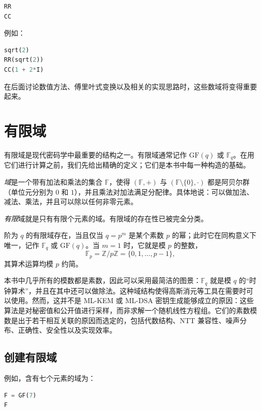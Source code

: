 \begin{lstlisting}[language=Python]
RR
CC
\end{lstlisting}

例如：

\begin{lstlisting}[language=Python]
sqrt(2)
RR(sqrt(2))
CC(1 + 2*I)
\end{lstlisting}

在后面讨论数值方法、傅里叶式变换以及相关的实现思路时，这些数域将变得重要起来。

\section{有限域}
有限域是现代密码学中最重要的结构之一。有限域通常记作 $\mathrm{GF}(q)$ 或 $\mathbb{F}_q$。在用它们进行计算之前，我们先给出精确的定义；它们是本书中每一种构造的基础。

\begin{definition}[域]
\emph{域}是一个带有加法和乘法的集合 $\mathbb{F}$，使得 $(\mathbb{F},+)$ 与 $(\mathbb{F}\setminus\{0\},\cdot)$ 都是阿贝尔群（单位元分别为 $0$ 和 $1$），并且乘法对加法满足分配律。具体地说：可以做加法、减法、乘法，并且可以除以任何非零元素。
\end{definition}

\emph{有限}域就是只有有限个元素的域。有限域的存在性已被完全分类。

\begin{theorem}[有限域的分类]
阶为 $q$ 的有限域存在，当且仅当 $q=p^m$ 是某个素数 $p$ 的幂；此时它在同构意义下唯一，记作 $\mathbb{F}_q$ 或 $\mathrm{GF}(q)$。当 $m=1$ 时，它就是模 $p$ 的整数，
\[
\mathbb{F}_p = \mathbb{Z}/p\mathbb{Z} = \{0,1,\dots,p-1\},
\]
其算术运算均模 $p$ 约简。
\end{theorem}

本书中几乎所有的模数都是素数，因此可以采用最简洁的图景：$\mathbb{F}_q$ 就是模 $q$ 的“时钟算术”，并且在其中还可以做除法。这种域结构使得高斯消元等工具在需要时可以使用。然而，这并不是 ML-KEM 或 ML-DSA 密钥生成能够成立的原因：这些算法是对秘密值和公开值进行采样，而非求解一个随机线性方程组。它们的素数模数是出于若干相互关联的原因而选定的，包括代数结构、NTT 兼容性、噪声分布、正确性、安全性以及实现效率。

\subsection{创建有限域}
例如，含有七个元素的域为：

\begin{lstlisting}[language=Python]
F = GF(7)
F
\end{lstlisting}

